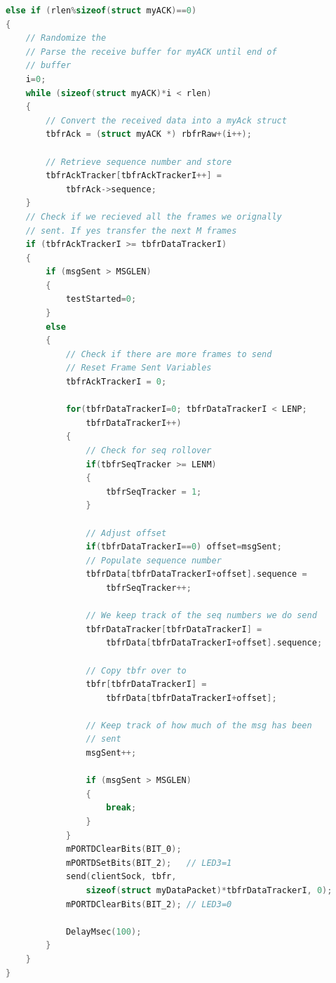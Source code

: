 \documentclass[12pt]{article}
\begin{document}
\begin{lstlisting}[language=c, 
caption=Sliding Window - ACK Packet Detector and Handler,
label=lst:slideackpacket]
else if (rlen%sizeof(struct myACK)==0)
{
    // Randomize the 
    // Parse the receive buffer for myACK until end of
    // buffer
    i=0;
    while (sizeof(struct myACK)*i < rlen)
    {
        // Convert the received data into a myAck struct
        tbfrAck = (struct myACK *) rbfrRaw+(i++);
        
        // Retrieve sequence number and store
        tbfrAckTracker[tbfrAckTrackerI++] = 
            tbfrAck->sequence;
    }
    // Check if we recieved all the frames we orignally
    // sent. If yes transfer the next M frames
    if (tbfrAckTrackerI >= tbfrDataTrackerI)
    {
        if (msgSent > MSGLEN)
        {
            testStarted=0;
        }
        else 
        {
            // Check if there are more frames to send
            // Reset Frame Sent Variables
            tbfrAckTrackerI = 0;

            for(tbfrDataTrackerI=0; tbfrDataTrackerI < LENP; 
                tbfrDataTrackerI++)
            {
                // Check for seq rollover
                if(tbfrSeqTracker >= LENM)
                {
                    tbfrSeqTracker = 1;
                }

                // Adjust offset
                if(tbfrDataTrackerI==0) offset=msgSent;
                // Populate sequence number
                tbfrData[tbfrDataTrackerI+offset].sequence = 
                    tbfrSeqTracker++;

                // We keep track of the seq numbers we do send
                tbfrDataTracker[tbfrDataTrackerI] = 
                    tbfrData[tbfrDataTrackerI+offset].sequence;

                // Copy tbfr over to 
                tbfr[tbfrDataTrackerI] = 
                    tbfrData[tbfrDataTrackerI+offset];

                // Keep track of how much of the msg has been
                // sent
                msgSent++;

                if (msgSent > MSGLEN)
                {
                    break;
                }
            }
            mPORTDClearBits(BIT_0);
            mPORTDSetBits(BIT_2);   // LED3=1
            send(clientSock, tbfr, 
                sizeof(struct myDataPacket)*tbfrDataTrackerI, 0);
            mPORTDClearBits(BIT_2); // LED3=0

            DelayMsec(100);
        }
    }
}      
\end{lstlisting}
\end{document}
